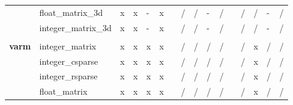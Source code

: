 \documentclass{article}
\begin{document}
\begin{longtable}{llllllllllllllll}
                & float\_matrix\_3d         & \cellcolor[HTML]{B7E1CD}x & \cellcolor[HTML]{B7E1CD}x & \cellcolor[HTML]{CFE2F3}- & \cellcolor[HTML]{B7E1CD}x &  & \cellcolor[HTML]{F4CCCC}/ & \cellcolor[HTML]{F4CCCC}/ & \cellcolor[HTML]{CFE2F3}- & \cellcolor[HTML]{F4CCCC}/ &  & \cellcolor[HTML]{F4CCCC}/ & \cellcolor[HTML]{F4CCCC}/ & \cellcolor[HTML]{CFE2F3}- & \cellcolor[HTML]{F4CCCC}/ \\
                & integer\_matrix\_3d       & \cellcolor[HTML]{B7E1CD}x & \cellcolor[HTML]{B7E1CD}x & \cellcolor[HTML]{CFE2F3}- & \cellcolor[HTML]{B7E1CD}x &  & \cellcolor[HTML]{F4CCCC}/ & \cellcolor[HTML]{F4CCCC}/ & \cellcolor[HTML]{CFE2F3}- & \cellcolor[HTML]{F4CCCC}/ &  & \cellcolor[HTML]{F4CCCC}/ & \cellcolor[HTML]{F4CCCC}/ & \cellcolor[HTML]{CFE2F3}- & \cellcolor[HTML]{F4CCCC}/ \\
                &                           &                           &                           &                           &                           &  &                           &                           &                           &                           &  &                           &                           &                           &                           \\
\textbf{varm}   & integer\_matrix           & \cellcolor[HTML]{B7E1CD}x & \cellcolor[HTML]{B7E1CD}x & \cellcolor[HTML]{B7E1CD}x & \cellcolor[HTML]{B7E1CD}x &  & \cellcolor[HTML]{F4CCCC}/ & \cellcolor[HTML]{F4CCCC}/ & \cellcolor[HTML]{F4CCCC}/ & \cellcolor[HTML]{F4CCCC}/ &  & \cellcolor[HTML]{F4CCCC}/ & \cellcolor[HTML]{B7E1CD}x & \cellcolor[HTML]{F4CCCC}/ & \cellcolor[HTML]{F4CCCC}/ \\
                & integer\_csparse          & \cellcolor[HTML]{B7E1CD}x & \cellcolor[HTML]{B7E1CD}x & \cellcolor[HTML]{B7E1CD}x & \cellcolor[HTML]{B7E1CD}x &  & \cellcolor[HTML]{F4CCCC}/ & \cellcolor[HTML]{F4CCCC}/ & \cellcolor[HTML]{F4CCCC}/ & \cellcolor[HTML]{F4CCCC}/ &  & \cellcolor[HTML]{F4CCCC}/ & \cellcolor[HTML]{B7E1CD}x & \cellcolor[HTML]{F4CCCC}/ & \cellcolor[HTML]{F4CCCC}/ \\
                & integer\_rsparse          & \cellcolor[HTML]{B7E1CD}x & \cellcolor[HTML]{B7E1CD}x & \cellcolor[HTML]{B7E1CD}x & \cellcolor[HTML]{B7E1CD}x &  & \cellcolor[HTML]{F4CCCC}/ & \cellcolor[HTML]{F4CCCC}/ & \cellcolor[HTML]{F4CCCC}/ & \cellcolor[HTML]{F4CCCC}/ &  & \cellcolor[HTML]{F4CCCC}/ & \cellcolor[HTML]{B7E1CD}x & \cellcolor[HTML]{F4CCCC}/ & \cellcolor[HTML]{F4CCCC}/ \\
                & float\_matrix             & \cellcolor[HTML]{B7E1CD}x & \cellcolor[HTML]{B7E1CD}x & \cellcolor[HTML]{B7E1CD}x & \cellcolor[HTML]{B7E1CD}x &  & \cellcolor[HTML]{F4CCCC}/ & \cellcolor[HTML]{F4CCCC}/ & \cellcolor[HTML]{F4CCCC}/ & \cellcolor[HTML]{F4CCCC}/ &  & \cellcolor[HTML]{F4CCCC}/ & \cellcolor[HTML]{B7E1CD}x & \cellcolor[HTML]{F4CCCC}/ & \cellcolor[HTML]{F4CCCC}/ \\

\end{longtable}
\end{document}
